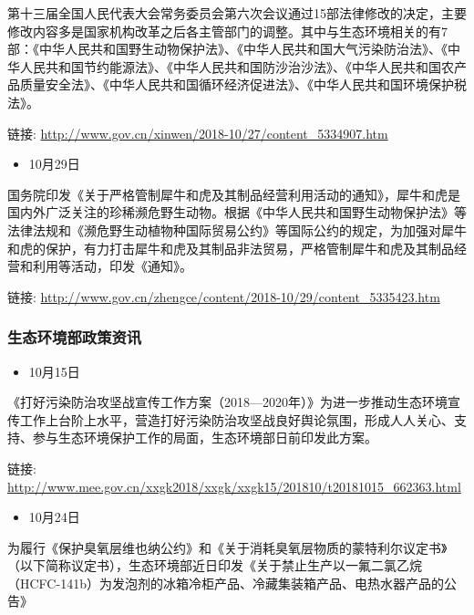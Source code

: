 \documentclass[]{book}
\providecommand{\tightlist}{%
  \setlength{\itemsep}{0pt}\setlength{\parskip}{0pt}}
\begin{document}
第十三届全国人民代表大会常务委员会第六次会议通过15部法律修改的决定，主要修改内容多是国家机构改革之后各主管部门的调整。其中与生态环境相关的有7部：《中华人民共和国野生动物保护法》、《中华人民共和国大气污染防治法》、《中华人民共和国节约能源法》、《中华人民共和国防沙治沙法》、《中华人民共和国农产品质量安全法》、《中华人民共和国循环经济促进法》、《中华人民共和国环境保护税法》。

链接: \url{http://www.gov.cn/xinwen/2018-10/27/content_5334907.htm}

\begin{itemize}
\tightlist
\item
  10月29日
\end{itemize}

国务院印发《关于严格管制犀牛和虎及其制品经营利用活动的通知》，犀牛和虎是国内外广泛关注的珍稀濒危野生动物。根据《中华人民共和国野生动物保护法》等法律法规和《濒危野生动植物种国际贸易公约》等国际公约的规定，为加强对犀牛和虎的保护，有力打击犀牛和虎及其制品非法贸易，严格管制犀牛和虎及其制品经营和利用等活动，印发《通知》。

链接: \url{http://www.gov.cn/zhengce/content/2018-10/29/content_5335423.htm}

\hypertarget{ux751fux6001ux73afux5883ux90e8ux653fux7b56ux8d44ux8baf-6}{%
\subsubsection*{生态环境部政策资讯}\label{ux751fux6001ux73afux5883ux90e8ux653fux7b56ux8d44ux8baf-6}}

\begin{itemize}
\tightlist
\item
  10月15日
\end{itemize}

《打好污染防治攻坚战宣传工作方案（2018---2020年）》为进一步推动生态环境宣传工作上台阶上水平，营造打好污染防治攻坚战良好舆论氛围，形成人人关心、支持、参与生态环境保护工作的局面，生态环境部日前印发此方案。

链接: \url{http://www.mee.gov.cn/xxgk2018/xxgk/xxgk15/201810/t20181015_662363.html}

\begin{itemize}
\tightlist
\item
  10月24日
\end{itemize}

为履行《保护臭氧层维也纳公约》和《关于消耗臭氧层物质的蒙特利尔议定书》（以下简称议定书），生态环境部近日印发《关于禁止生产以一氟二氯乙烷（HCFC-141b）为发泡剂的冰箱冷柜产品、冷藏集装箱产品、电热水器产品的公告》
\end{document}

